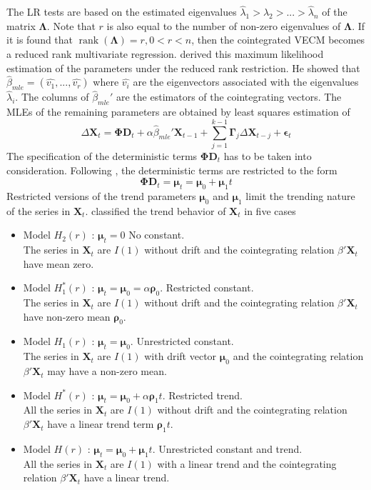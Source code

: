 \documentclass[11pt,a4,twosided,singlespacing,titlepagenumber=on]{scrreprt}
\numberwithin{equation}{chapter} %
\theoremstyle{remark}
\DeclareMathOperator{\rank}{rank}
\newcommand{\matr}[1]{\mathbf{#1}}
\begin{document}
The LR tests are based on the estimated eigenvalues $\hat{\lambda}_1 > \hat{\lambda}_2 > ... > \hat{\lambda}_n$ of the matrix $\matr{\Lambda}$. Note that $r$ is also equal to the number of non-zero eigenvalues of $\matr{\Lambda}$. If it is found that $\rank\left(\matr{\Lambda}\right) = r, 0 < r < n$, then the cointegrated VECM becomes a reduced rank multivariate regression. \cite{johansen1988} derived this maximum likelihood estimation of the parameters under the reduced rank restriction. He showed that $\hat{\beta}_{mle} = (\hat{v_1},...,\hat{v_r})$ where $\hat{v_i}$ are the eigenvectors associated with the eigenvalues $\hat{\lambda}_i$. The columns of $\hat{\beta}_{mle}'$ are the estimators of the cointegrating vectors. The MLEs of the remaining parameters are obtained by least squares estimation of
\begin{equation}
\Delta \matr{X}_t = \matr{\Phi} \matr{D}_t + \alpha \hat{\beta}_{mle}' \matr{X}_{t-1} + \sum_{j=1}^{k-1} \matr{\Gamma}_j \Delta \matr{X}_{t-j} + \matr{\epsilon}_t
\end{equation}
The specification of the deterministic terms $\matr{\Phi} \matr{D}_t$ has to be taken into consideration. Following \cite{johansen1995}, the deterministic terms are restricted to the form
\begin{equation}
\matr{\Phi} \matr{D}_t = \matr{\mu}_t = \matr{\mu}_0 + \matr{\mu}_1 t
\end{equation}
Restricted versions of the trend parameters $\matr{\mu}_0$ and $\matr{\mu}_1$ limit the trending nature of the series in $\matr{X}_t$. \cite{johansen1995} classified the trend behavior of $\matr{X}_t$ in five cases
\begin{itemize}
\item Model $H_2(r)$ : $\matr{\mu}_t = 0$ No constant. \\
The series in $\matr{X}_t$ are $I(1)$ without drift and the cointegrating relation $\beta' \matr{X}_t$ have mean zero.
\item Model $H_1^*(r)$ : $\matr{\mu}_t = \matr{\mu}_0 = \alpha \matr{\rho}_0$. Restricted constant. \\ The series in $\matr{X}_t$ are $I(1)$ without drift and the cointegrating relation $\beta' \matr{X}_t$ have non-zero mean $\matr{\rho}_0$.
\item Model $H_1(r)$ : $\matr{\mu}_t = \matr{\mu}_0$. Unrestricted constant. \\ The series in $\matr{X}_t$ are $I(1)$ with drift vector $\matr{\mu}_0$ and the cointegrating relation $\beta' \matr{X}_t$ may have a non-zero mean.
\item Model $H^*(r)$ : $\matr{\mu}_t = \matr{\mu}_0 + \alpha \matr{\rho}_1 t$. Restricted trend. \\ All the series in $\matr{X}_t$ are $I(1)$ without drift and the cointegrating relation $\beta' \matr{X}_t$ have a linear trend term $\matr{\rho}_1 t$.
\item Model $H(r)$ : $\matr{\mu}_t = \matr{\mu}_0 + \matr{\mu}_1 t$. Unrestricted constant and trend. \\
All the series in $\matr{X}_t$ are $I(1)$ with a linear trend and the cointegrating relation $\beta' \matr{X}_t$ have a linear trend.
\end{itemize}
\end{document}
